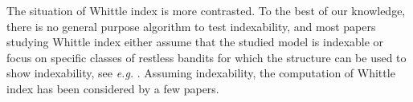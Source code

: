\documentclass[acmsmall,screen,anonymous]{acmart}
\begin{document}
The situation of Whittle index is more contrasted. To the best of our knowledge, there is no general purpose algorithm to test indexability, and most papers studying Whittle index either assume that the studied model is indexable or focus on specific classes of restless bandits for which the structure can be used to show indexability, see \emph{e.g.} \cite{aalto2011properties,akbarzadeh2019restless,akbarzadeh2021maintenance,borkar2017whittle}.  Assuming indexability, the computation of Whittle index has been considered by a few papers.

\end{document}

